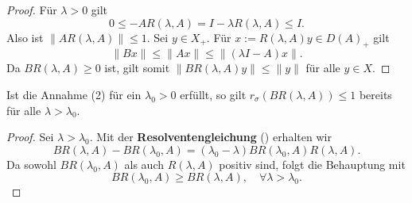 \begin{proof}
\par
Für $\lambda >0$ gilt
\begin{equation*}
0\leq -AR(\lambda, A)=I-\lambda R(\lambda, A)\leq I.
\end{equation*}
Also ist $\|AR(\lambda, A)\|\leq1$. Sei $y\in X_+$. Für $x:=R(\lambda, A)y\in D(A)_+$ gilt
\begin{equation*}
\|Bx\|\leq \|Ax\|\leq \|(\lambda I-A)x\|.    
\end{equation*}
Da $BR(\lambda, A)\geq0$ ist, gilt somit $\|BR(\lambda, A)y\|\leq \|y\|$ für alle $y\in X$.
\end{proof}

\begin{bem}
Ist die Annahme (2) für ein $\lambda_0>0$ erfüllt, so gilt $r_\sigma(BR(\lambda, A))\leq1$ bereits für alle $\lambda > \lambda_0$.
\end{bem}


\begin{proof}
\par
Sei $\lambda > \lambda_0$. Mit der \index{}\textbf{Resolventengleichung} () erhalten wir
\begin{equation*}
BR(\lambda, A)-BR(\lambda_0, A)=(\lambda_0 - \lambda)BR(\lambda_0, A)R(\lambda, A).
\end{equation*}
Da sowohl $BR(\lambda_0, A)$ als auch $R(\lambda,A)$ positiv sind, folgt die Behauptung mit 
\begin{equation*}
    BR(\lambda_0, A)\geq BR(\lambda,A),\quad\forall \lambda > \lambda_0.
\end{equation*}
\end{proof}

